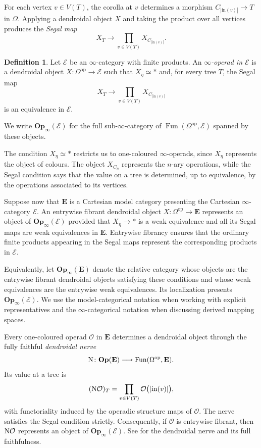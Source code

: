 \documentclass{amsart}
\newcommand{\bE}{\mathbf{E}}
\newcommand{\Op}{\mathbf{Op}}
\newcommand{\Fun}{\operatorname{Fun}}
\newcommand{\nerve}{\textnormal{N}}
\theoremstyle{definition}
\newtheorem{definition}[theorem]{Definition}%
\numberwithin{equation}{section}
\begin{document}
For each vertex $v\in V(T)$, the corolla at $v$ determines a morphism
$C_{|\mathrm{in}(v)|}\to T$ in $\Omega$. Applying a dendroidal object
$X$ and taking the product over all vertices produces the
\emph{Segal map}
\[
X_T\longrightarrow
\prod_{v\in V(T)}X_{C_{|\mathrm{in}(v)|}}.
\]

\begin{definition}
\label{def: infty operad}
Let $\mathcal E$ be an $\infty$-category with finite products. An
\emph{$\infty$-operad in $\mathcal E$} is a dendroidal object
$X\colon\Omega^{\mathrm{op}}\to\mathcal E$ such that $X_\eta\simeq *$ and,
for every tree $T$, the Segal map
\[
X_T\longrightarrow
\prod_{v\in V(T)}X_{C_{|\mathrm{in}(v)|}}
\]
is an equivalence in $\mathcal E$.

We write $\Op_\infty(\mathcal E)$ for the full sub-$\infty$-category
of $\Fun(\Omega^{\mathrm{op}},\mathcal E)$ spanned by these objects.
\end{definition}

The condition $X_\eta\simeq *$ restricts us to one-coloured
$\infty$-operads, since $X_\eta$ represents the object of colours.
The object $X_{C_n}$ represents the $n$-ary operations, while the
Segal condition says that the value on a tree is determined, up to
equivalence, by the operations associated to its vertices.

Suppose now that $\bE$ is a Cartesian model category presenting the
Cartesian $\infty$-category $\mathcal E$. An entrywise fibrant
dendroidal object $X\colon\Omega^{\mathrm{op}}\to\bE$ represents an object of
$\Op_\infty(\mathcal E)$ provided that $X_\eta\to *$ is a weak
equivalence and all its Segal maps are weak equivalences in $\bE$.
Entrywise fibrancy ensures
that the ordinary finite products appearing in the Segal maps
represent the corresponding products in $\mathcal E$.

Equivalently, let $\Op_\infty(\bE)$ denote the relative category whose objects are the entrywise fibrant dendroidal objects satisfying these conditions and whose weak equivalences are the entrywise weak equivalences. Its localization presents $\Op_\infty(\mathcal E)$. We use the model-categorical notation when
working with explicit representatives and the $\infty$-categorical notation when discussing derived mapping spaces.

Every one-coloured operad $\mathcal O$ in $\bE$ determines a
dendroidal object through the fully faithful \emph{dendroidal nerve}
\[
\nerve\colon
\Op(\bE)\longrightarrow
\Fun(\Omega^{\mathrm{op}},\bE).
\]
Its value at a tree is
\[
(\nerve\mathcal O)_T
=
\prod_{v\in V(T)}
\mathcal O\bigl(|\mathrm{in}(v)|\bigr),
\]
with functoriality induced by the operadic structure maps of
$\mathcal O$. The nerve satisfies the Segal condition strictly.
Consequently, if $\mathcal O$ is entrywise fibrant, then
$\nerve\mathcal O$ represents an object of
$\Op_\infty(\mathcal E)$. See \cite{MW1} for the dendroidal nerve and
its full faithfulness.
\end{document}
